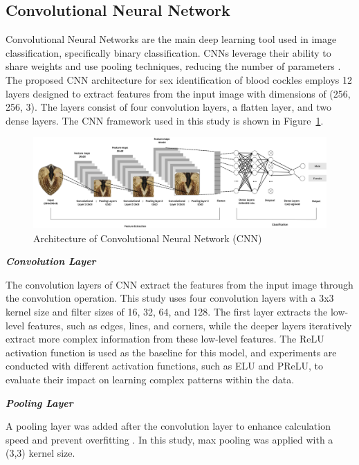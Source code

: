 \subsection{Convolutional Neural Network}

Convolutional Neural Networks are the main deep learning tool used in image classification, specifically binary classification. CNNs leverage their ability to share weights and use pooling techniques, reducing the number of parameters \cite{cui2020}. The proposed CNN architecture for sex identification of blood cockles employs 12 layers designed to extract features from the input image with dimensions of (256, 256, 3). The layers consist of four convolution layers, a flatten layer, and two dense layers. The CNN framework used in this study is shown in Figure~\ref{fig:cnn_architecture}.

\begin{figure}[h]
	\centering
	\includegraphics[width=\textwidth]{figures/cnn_architecture.png}
	\caption{Architecture of Convolutional Neural Network (CNN)}
	\label{fig:cnn_architecture}
\end{figure}

\textbf{\textit{Convolution Layer}}

The convolution layers of CNN extract the features from the input image through the convolution operation. This study uses four convolution layers with a 3x3 kernel size and filter sizes of 16, 32, 64, and 128. The first layer extracts the low-level features, such as edges, lines, and corners, while the deeper layers iteratively extract more complex information from these low-level features. The ReLU activation function is used as the baseline for this model, and experiments are conducted with different activation functions, such as ELU and PReLU, to evaluate their impact on learning complex patterns within the data.

\textbf{\textit{Pooling Layer}}

A pooling layer was added after the convolution layer to enhance calculation speed and prevent overfitting \cite{cui2020}. In this study, max pooling was applied with a (3,3) kernel size.

